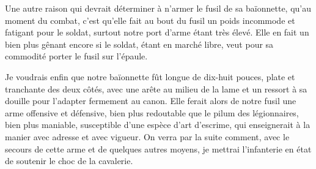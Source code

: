 \documentclass[french,twoside]{book} %
\begin{document}
Une autre raison qui devrait déterminer à n’armer le fusil de sa baïonnette, qu’au moment du combat, c’est qu’elle fait au bout du fusil un poids incommode et fatigant pour le soldat, surtout notre port d’arme étant très élevé. Elle en fait un bien plus gênant encore si le soldat, étant en marché libre, veut pour sa commodité porter le fusil sur l’épaule.\par
Je voudrais enfin que notre baïonnette fût longue de dix-huit pouces, plate et tranchante des deux côtés, avec une arête au milieu de la lame et un ressort à sa douille pour l’adapter fermement au canon. Elle ferait alors de notre fusil une arme offensive et défensive, bien plus redoutable que le pilum des légionnaires, bien plus maniable, susceptible d’une espèce d’art d’escrime, qui enseignerait à la manier avec adresse et avec vigueur. On verra par la suite comment, avec le secours de cette arme et de quelques autres moyens, je mettrai l’infanterie en état de soutenir le choc de la cavalerie.
\end{document}
